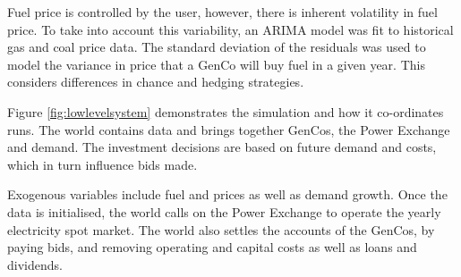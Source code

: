 Fuel price is controlled by the user, however, there is inherent volatility in fuel price. To take into account this variability, an ARIMA \cite{ARIMA} model was fit to historical gas and coal price data. The standard deviation of the residuals was used to model the variance in price that a GenCo will buy fuel in a given year. This considers differences in chance and hedging strategies.



Figure \ref{fig:lowlevelsystem} demonstrates the simulation and how it co-ordinates runs. The world contains data and brings together GenCos, the Power Exchange and demand. The investment decisions are based on future demand and costs, which in turn influence bids made.

Exogenous variables include fuel and  prices as well as demand growth. Once the data is initialised, the world calls on the Power Exchange to operate the yearly electricity spot market. The world also settles the accounts of the GenCos, by paying bids, and removing operating and capital costs as well as loans and dividends.










